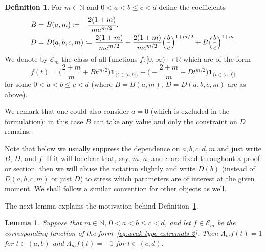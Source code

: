 \documentclass[a4paper]{amsart} %
\newtheorem{lemma}[theorem]{Lemma}
\theoremstyle{definition}
\newtheorem{definition}[theorem]{Definition}
\theoremstyle{remark}
\numberwithin{equation}{section}
\newcommand*{\RR}{\mathbb{R}}
\newcommand*{\NNone}{\mathbb{N}}
\newcommand*{\ind}[1]{\mathbf{1}_{#1}}
\newcommand*{\indbr}[1]{\ind{\{#1\}}}
\newcommand*{\fclass}[1]{\mathcal{E}_{#1}}
\newcommand*{\dZero}{B}%
\newcommand*{\dOne}{D}%
\begin{document}
\begin{definition}
\label{def:weak-type-extremals-2}
For $m\in\NNone$ and $0<a<b\leq c<d$ 
define  the coefficients 
\begin{align*}
\dZero  &= \dZero(a, m) \coloneqq -\frac{2(1+m)}{ma^{m/2}},\\
\dOne &=  \dOne(a,b,c, m) \coloneqq  \frac{2(1+m)}{m c^{m/2}} +  \frac{2(1+m)}{m c^{m/2}} \Bigl(\frac{b}{c}\Bigr)^{1+m/2}+ \dZero\Bigl(\frac{b}{c}\Bigr)^{1+m}.
\end{align*}
We denote by $\fclass{m}$
the class of all functions $f\colon [0,\infty)\to \RR$
which are of the form
\begin{equation}
\label{eq:weak-type-extremals-2}
f(t)=
\bigl(\frac{2+m}{m} +\dZero t^{m/2}\bigr) \indbr{t\in (a,b]}
+ \bigl(-\frac{2+m}{m} + \dOne t^{m/2}\bigr) \indbr{t\in (c,d]}
\end{equation}
for some $0<a<b\leq c<d$ (where $\dZero  = \dZero(a, m)$,
$\dOne =  \dOne(a,b,c, m)$ are as above).
\end{definition}

We remark that one could also consider $a=0$ (which  is excluded in the formulation): in this case $\dZero$ can take any value and only the constraint on $\dOne$ remains. 

Note that below we usually suppress the dependence on $a, b, c, d, m$
and just write $\dZero$, $\dOne$, and $f$.
If it will be clear that, 
say, $m$, $a$, and $c$ are fixed throughout a proof or section,
then we will abuse the notation slightly and write $\dOne(b)$ 
(instead of $\dOne(a,b,c,m)$ or just $\dOne$)
to stress which parameters are of interest at the given moment.
We shall follow a similar convention for other objects as well.

The next lemma explains the motivation behind Definition~\ref{def:weak-type-extremals-2}.

\begin{lemma}
\label{lem:weak-type-extremals-2}
Suppose that $m\in\NNone$, $0<a<b\leq c<d$, 
and let $f\in\fclass{m}$ be the corresponding  function
of the form~\eqref{eq:weak-type-extremals-2}. 	
Then $\Lambda_m f(t)=1$ for $t\in(a,b)$ and $\Lambda_m f(t)=-1$ for $t\in(c,d)$.
\end{lemma}
\end{document}
